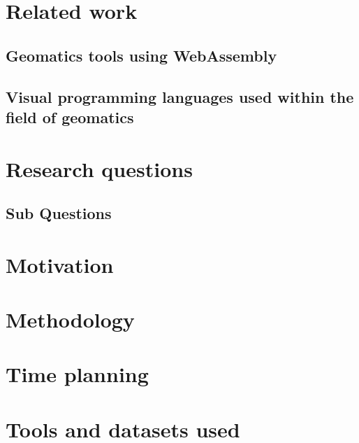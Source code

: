 \section{Related work}


\subsection{Geomatics tools using WebAssembly}

% 
\subsection{Visual programming languages used within the field of geomatics}

\section{Research questions}

\subsection{Sub Questions}



\section{Motivation}



\section{Methodology}


\section{Time planning}


\section{Tools and datasets used}

